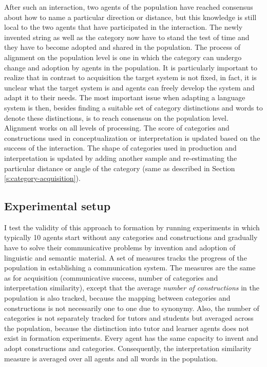 After such an interaction, two agents of the population have reached consensus about 
how to name a particular direction or distance, but this knowledge is still local to the two
agents that have participated in the interaction. The newly invented string as well
as the category now have to stand the test of time and they have to become
adopted and shared in the population. The process of alignment on the 
population level is one in which the category can undergo change and adoption
by agents in the population. It is particularly important to realize that 
in contrast to acquisition the target system is not fixed, in fact, it is unclear what
the target system is and agents can freely develop the system and adapt it to
their needs. The most important issue when adapting a language system is 
then, besides finding a suitable set of category distinctions and words to denote
these distinctions, is to reach consensus on the population level. Alignment
works on all levels of processing. The score of categories and constructions used in 
conceptualization or interpretation is updated based on the success of the interaction.
The shape of categories used in production and interpretation is updated by 
adding another sample and re-estimating the particular distance or angle
of the category (same as described in Section \ref{s:category-acquisition}).

\subsection{Experimental setup}
I test the validity of this approach to formation by running experiments 
in which typically 10 agents start without any categories and constructions 
and gradually have to solve their communicative problems by invention and
adoption of linguistic and semantic material. A set of measures tracks the 
progress of the population in establishing a communication system. The
measures are the same as for acquisition (communicative success,
number of categories and interpretation similarity), except that 
the average \emph{number of constructions} in the population is also tracked, 
because the mapping between categories and constructions is not necessarily one
to one due to synonymy. Also, the number of categories is
not separately tracked for tutors and students but averaged across the population, 
because the distinction into tutor and learner agents does not exist in formation 
experiments. Every agent has the same capacity to invent and adopt 
constructions and categories. Consequently, the interpretation similarity 
measure is averaged over all agents and all words in the population.


